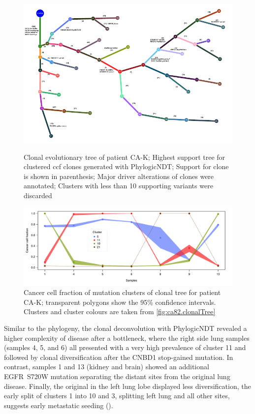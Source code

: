 \begin{figure}[ht]
\centering	
\includegraphics[width=.99\linewidth]{Figures/CASCADE/CA82/CA82.clonaltree.pdf}
\caption[Clonal evolutionary tree CA-K]{Clonal evolutionary tree of patient CA-K; Highest support tree for clustered ccf clones generated with PhylogicNDT; Support for clone is shown in parenthesis; Major driver alterations of clones were annotated; Clusters with less than 10 supporting variants were discarded} \label{fig:ca82.clonalTree}

\vspace{\floatsep}

\includegraphics[width=.99\linewidth]{Figures/CASCADE/CA82/CA82.ccf_cluster.pdf}
\caption[Cancer cell fraction of mutation clusters of clonal tree for patient CA-K]{Cancer cell fraction of mutation clusters of clonal tree for patient CA-K; transparent polygons show the 95\% confidence intervals. Clusters and cluster colours are taken from \protect\autoref{fig:ca82.clonalTree}} \label{fig:ca82.ccfCluster}

\end{figure}


Similar to the phylogeny, the clonal deconvolution with PhylogicNDT revealed a higher complexity of disease after a bottleneck, where the right side lung samples (samples 4, 5, and 6) all presented with a very high prevalence of cluster 11 and followed by clonal diversification after the CNBD1 stop-gained mutation. In contrast, samples 1 and 13 (kidney and brain) showed an additional EGFR~S720W mutation separating the distant sites from the original lung disease. Finally, the original  in the left lung lobe displayed less diversification, the early split of clusters 1 into 10 and 3, splitting  left lung and all other sites, suggests early metastatic seeding (). 



